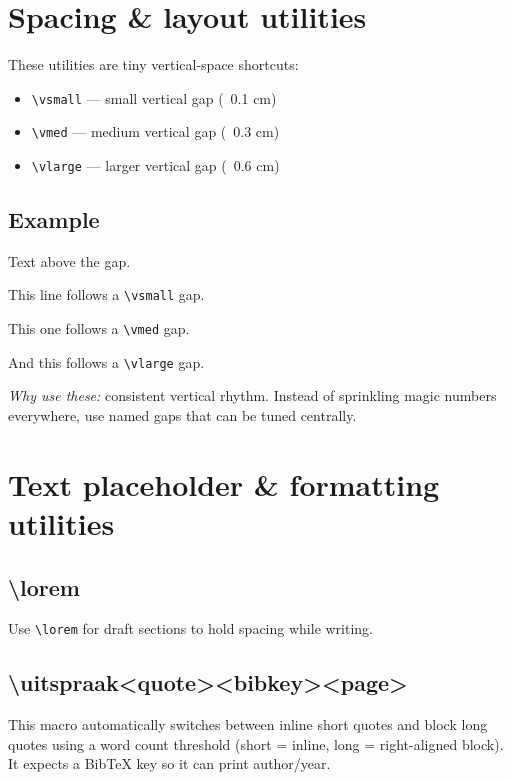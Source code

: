 \documentclass[nonacm, sigconf, balance=true]{acmart}
\begin{document}
    \section{Spacing \& layout utilities}
    These utilities are tiny vertical-space shortcuts:
    \begin{itemize}
        \item \verb|\vsmall| — small vertical gap (~0.1 cm)
        \item \verb|\vmed| — medium vertical gap (~0.3 cm)
        \item \verb|\vlarge| — larger vertical gap (~0.6 cm)
    \end{itemize}

    \subsection*{Example}
    Text above the gap.\vsmall

    This line follows a \verb|\vsmall| gap.

    \vmed

    This one follows a \verb|\vmed| gap.

    \vlarge

    And this follows a \verb|\vlarge| gap.

    \vsmall

    \noindent\textit{Why use these:} consistent vertical rhythm. Instead of sprinkling magic numbers everywhere, use named gaps that can be tuned centrally.



    \section{Text placeholder \& formatting utilities}

    \subsection[\textbackslash lorem]{\textbackslash lorem}
    Use \verb|\lorem| for draft sections to hold spacing while writing.

    \lorem

    \subsection{\textbackslash uitspraak{<quote>}{<bibkey>}{<page>}}
    This macro automatically switches between inline short quotes and block long quotes using a word count threshold (short = inline, long = right-aligned block). It expects a BibTeX key so it can print author/year.
\end{document}
